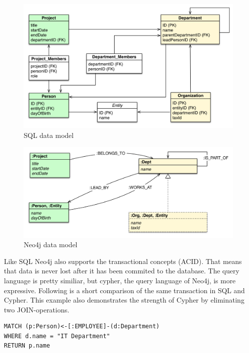 \begin{figure}[H]
	\includegraphics[width=\linewidth,keepaspectratio]{images/neo4j/organization_relational.png}
	\caption{SQL data model}
\end{figure}

\begin{figure}[H]
	\includegraphics[width=\linewidth,keepaspectratio]{images/neo4j/organization_graph.png}
	\caption{Neo4j data model}
\end{figure}

Like SQL Neo4j also supports the transactional concepts (ACID). That means that data is never lost after it has been commited to the database.
The query language is pretty similiar, but cypher, the query language of Neo4j, is more expressive.
Following is a short comparison of the same transaction in SQL and Cypher. This example also demonstrates the strength of Cypher by eliminating two JOIN-operations.

\begin{lstlisting}[frame=single, caption=Cypher Statement, label=gcystm]
MATCH (p:Person)<-[:EMPLOYEE]-(d:Department)
WHERE d.name = "IT Department"
RETURN p.name
\end{lstlisting}


